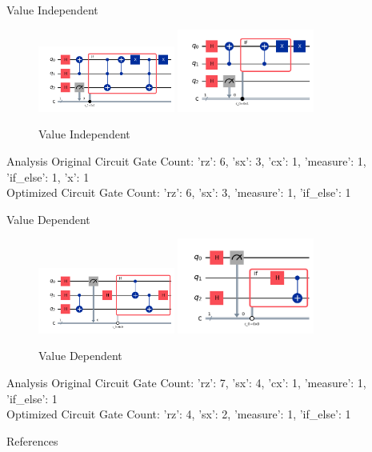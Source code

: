 \documentclass[10pt]{beamer}
\begin{document}

\begin{frame}{Value Independent}
  \begin{figure}
    \centering
    \includegraphics[width=0.4\textwidth]{Images/val_ind_1.png}
    \includegraphics[width=0.4\textwidth]{Images/val_ind_2.png}
    \caption{Value Independent}
  \end{figure}

  \begin{block}{Analysis}
    Original Circuit Gate Count: {'rz': 6, 'sx': 3, 'cx': 1, 'measure': 1, 'if\_else': 1, 'x': 1} \\
    Optimized Circuit Gate Count: {'rz': 6, 'sx': 3, 'measure': 1, 'if\_else': 1}
  \end{block}
\end{frame}

\begin{frame}{Value Dependent}
  \begin{figure}
    \centering
    \includegraphics[width=0.4\textwidth]{Images/val_dep_1.png}
    \includegraphics[width=0.4\textwidth]{Images/val_dep_2.png}
    \caption{Value Dependent}
  \end{figure}

  \begin{block}{Analysis}
    Original Circuit Gate Count: {'rz': 7, 'sx': 4, 'cx': 1, 'measure': 1, 'if\_else': 1} \\
    Optimized Circuit Gate Count: {'rz': 4, 'sx': 2, 'measure': 1, 'if\_else': 1}
  \end{block}
\end{frame}

\begin{frame}[allowframebreaks]{References}
  
  
\end{frame}

\end{document}
